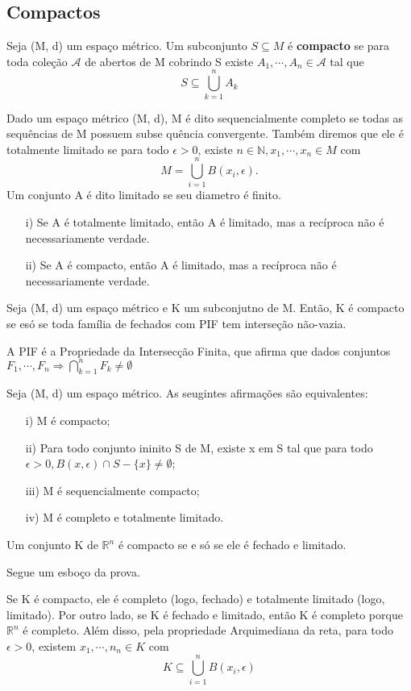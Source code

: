 \documentclass[complex.tex]{subfiles}
\begin{document}
\subsection{Compactos}
\begin{def*}
	Seja (M, d) um espaço métrico. Um subconjunto $S\subseteq{M}$ é \textbf{compacto} se para toda coleção $\mathcal{A}$
	de abertos de M cobrindo S existe $A_1, \cdots, A_{n}\in \mathcal{A}$ tal que
	$$
		S\subseteq\bigcup_{k=1}^{n}A_{k}
	$$
\end{def*}
Dado um espaço métrico (M, d), M é dito sequencialmente completo se todas as sequências de M possuem subse
quência convergente. Também diremos que ele é totalmente limitado se para todo $\epsilon > 0$, existe $n\in \mathbb{N},
	x_{1}, \cdots, x_{n}\in{M}$ com
$$
	M = \bigcup_{i=1}^{n}B(x_{i}, \epsilon).
$$
Um conjunto A é dito limitado se seu diametro é finito.
\begin{exer*}
	\begin{itemize}
		\item[i)] Se A é totalmente limitado, então A é limitado, mas a recíproca não é necessariamente verdade.
		\item[ii)] Se A é compacto, então A é limitado, mas a recíproca não é necessariamente verdade.
	\end{itemize}
\end{exer*}
\begin{prop*}
	Seja (M, d) um espaço métrico e K um subconjutno de M. Então, K é compacto se esó se toda família de fechados com PIF tem
	interseção não-vazia.
\end{prop*}
A PIF é a Propriedade da Intersecção Finita, que afirma que dados conjuntos $F _{1}, \cdots, F_{n}\Rightarrow \bigcap\limits_{k=1}^{n}F_{k}\neq\emptyset$
\begin{theorem*}
	Seja (M, d) um espaço métrico. As seugintes afirmações são equivalentes:
	\begin{itemize}
		\item[i)]M é compacto;
		\item[ii)] Para todo conjunto ininito S de M, existe x em S tal que para todo $\epsilon > 0, B(x, \epsilon)\cap{S-\{x\}}\neq\emptyset$;
		\item[iii)] M é sequencialmente compacto;
		\item[iv)] M é completo e totalmente limitado.
	\end{itemize}
\end{theorem*}
\begin{theorem*}
	Um conjunto K de $\mathbb{R}^{n}$ é compacto se e só se ele é fechado e limitado.
\end{theorem*}
Segue um esboço da prova.
\begin{proof*}
	Se K é compacto, ele é completo (logo, fechado) e totalmente limitado (logo, limitado). Por outro lado, se K é fechado
	e limitado, então K é completo porque $\mathbb{R}^{n}$ é completo. Além disso, pela propriedade Arquimediana da reta,
	para todo $\epsilon > 0$, existem $x_1, \cdots, n_{n}\in{K}$ com
	$$
		K\subseteq{\bigcup_{i=1}^{n}B(x_{i}, \epsilon)}
	$$
\end{proof*}
\end{document}
